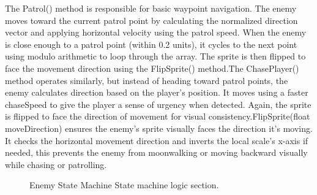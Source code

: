 \documentclass[12pt,oneside,openright,a4paper]{cpe-english-project}
\begin{document}
The Patrol() method is responsible for basic waypoint navigation. The enemy moves toward the current patrol point by calculating the normalized direction vector and applying horizontal velocity using the patrol speed. When the enemy is close enough to a patrol point (within 0.2 units), it cycles to the next point using modulo arithmetic to loop through the array. The sprite is then flipped to face the movement direction using the FlipSprite() method.The ChasePlayer() method operates similarly, but instead of heading toward patrol points, the enemy calculates direction based on the player's position. It moves using a faster chaseSpeed to give the player a sense of urgency when detected. Again, the sprite is flipped to face the direction of movement for visual consistency.FlipSprite(float moveDirection) ensures the enemy's sprite visually faces the direction it's moving. It checks the horizontal movement direction and inverts the local scale’s x-axis if needed, this prevents the enemy from moonwalking or moving backward visually while chasing or patrolling.\par 
 \begin{figure}[!h]
 \centering
\caption{Enemy State Machine State machine logic section.}\label{fig:ESMsm}
\end{figure}
\end{document}

